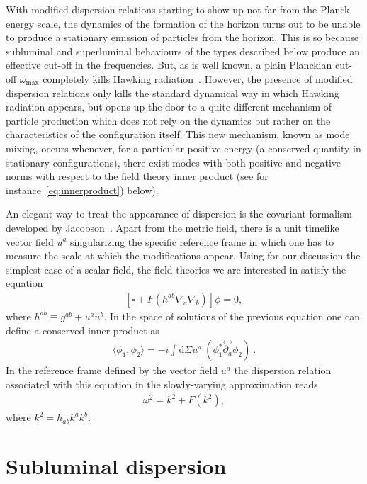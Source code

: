 \documentclass[11pt,a4paper]{article}
\newcommand{\diff}{\text{d}}
\begin{document}
With modified dispersion relations starting to show up not far from the Planck
energy scale, the dynamics of the formation of the horizon turns out to be unable to
produce a stationary emission of particles from the horizon. 
This is so because
subluminal and superluminal behaviours of the types described below produce an effective cut-off in the frequencies. But, as is well known, a plain Planckian
cut-off $\omega_\text{max}$ completely kills Hawking radiation~\cite{jacobson,barcelo-sensitivity}. However, the presence of modified dispersion relations only kills the standard 
dynamical way in which Hawking radiation appears, but  opens up the door to a quite different mechanism of particle production which does not rely on the dynamics but rather on the characteristics of the configuration itself. This new mechanism, known as mode
mixing, occurs whenever, for a particular positive energy (a conserved quantity
in stationary configurations), there exist modes with both positive and negative
norms with respect to the field theory inner product (see for instance~\ref{eq:innerproduct}) below).
 
An elegant way to treat the appearance of dispersion is the covariant formalism
developed by Jacobson~\cite{jacobson-vector}.  Apart from the metric field, there
is a unit timelike vector field $u^a$ singularizing the specific reference frame in
which one has to measure the scale at which the modifications appear. Using for
our discussion the simplest case of a scalar field, the field theories we are
interested in satisfy the equation
%
\begin{eqnarray}
\left[\square + F(h^{ab} \nabla_a \nabla_b) \right] \phi =0,
\end{eqnarray}
%   
where $h^{ab} \equiv g^{ab}+u^a u^b$. 
In the space of solutions of the previous equation one can define a conserved inner product as 
%
\begin{eqnarray}
\langle \phi_1,\phi_2\rangle =
-i \int \diff\Sigma u^a ~ (\phi_1^* \stackrel{\leftrightarrow}{\partial_a} \phi_2)~.
\label{eq:innerproduct}
\end{eqnarray}
%
 In the reference frame defined by the vector field $u^a$ the dispersion
relation associated with this equation in the slowly-varying
approximation reads
%
\begin{eqnarray}
\omega^2 = k^2 + F(k^2),
\end{eqnarray}
%
where $k^2=h_{ab}k^ak^b$.


\section{Subluminal dispersion}
\label{Sec:Sub}
\end{document}
